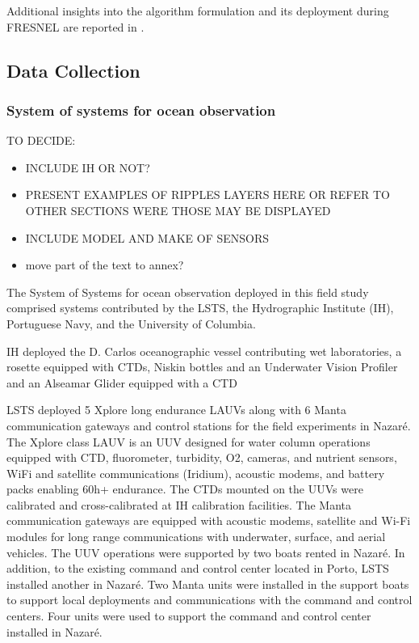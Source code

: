 Additional insights into the algorithm formulation and its deployment during FRESNEL are reported in \cite{bernacchi2025}.

\subsection{Data Collection}

\subsubsection{System of systems for ocean observation}

TO DECIDE: 
\begin{itemize}
    \item INCLUDE IH OR NOT?
    \item PRESENT EXAMPLES OF RIPPLES LAYERS HERE OR REFER TO OTHER SECTIONS WERE THOSE MAY BE DISPLAYED
    \item INCLUDE MODEL AND MAKE OF SENSORS
    \item move part of the text to annex?
\end{itemize}

The System of Systems for ocean observation deployed in this field study comprised systems contributed by the LSTS, the Hydrographic Institute (IH), Portuguese Navy, and the University of Columbia.

IH deployed the D. Carlos oceanographic vessel contributing wet laboratories, a rosette equipped with CTDs, Niskin bottles and an Underwater Vision Profiler %
and an Alseamar Glider equipped with a CTD %

LSTS deployed 5 Xplore long endurance LAUVs along with 6 Manta communication gateways and control stations for the field experiments in Nazaré. The Xplore class LAUV %
is an UUV designed for water column operations equipped with CTD, fluorometer, turbidity, O2, cameras, and nutrient sensors, WiFi and satellite communications (Iridium), acoustic modems, and battery packs enabling 60h+ endurance. The CTDs mounted on the UUVs were calibrated and cross-calibrated at IH calibration facilities. The Manta communication gateways %
are equipped with acoustic modems, satellite and Wi-Fi modules for long range communications with underwater, surface, and aerial vehicles. The UUV operations were supported by two boats rented in Nazaré. In addition, to the existing command and control center located in Porto, LSTS installed another in Nazaré. Two Manta units were installed in the support boats to support local deployments and communications with the command and control centers. Four units were used to support the command and control center installed in Nazaré.

